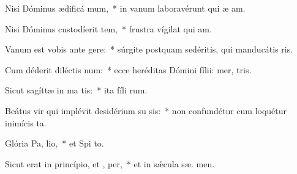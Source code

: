 \item Nisi Dóminus ædificá mum,~* in vanum laboravérunt qui æ am.
\item Nisi Dóminus custodíerit tem,~* frustra vígilat qui  am.
\item Vanum est vobis ante  gere:~* súrgite postquam sedéritis, qui manducátis  ris.
\item Cum déderit diléctis  num:~* ecce heréditas Dómini fílii: mer,  tris.
\item Sicut sagíttæ in ma tis:~* ita fíli rum.
\item Beátus vir qui implévit desidérium su  sis:~* non confundétur cum loquétur inimícis   ta.
\item Glória Pa,  lio,~* et Spi to.
\item Sicut erat in princípio, et ,  per,~* et in sǽcula sæ. men.
